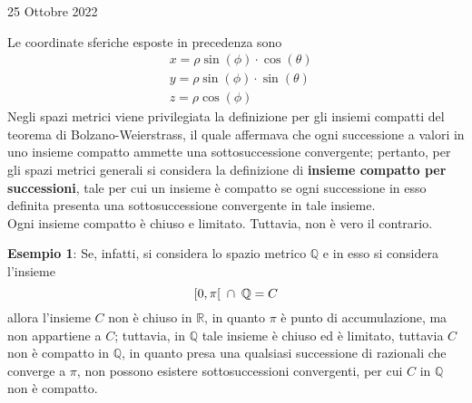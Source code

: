 \documentclass[a4paper]{extarticle}
\begin{document}
\newpage
\noindent
\begin{center}
    25 Ottobre 2022
\end{center}
Le coordinate sferiche esposte in precedenza sono
\begin{align*}
    &x=\rho \sin(\phi) \cdot \cos(\theta)\\
    &y=\rho \sin(\phi) \cdot \sin(\theta)\\
    &z=\rho \cos(\phi)
\end{align*}
Negli spazi metrici viene privilegiata la definizione per gli insiemi compatti del teorema di Bolzano-Weierstrass, il quale affermava che ogni successione a valori in uno insieme compatto ammette una sottosuccessione convergente; pertanto, per gli spazi metrici generali si considera la definizione di \textbf{insieme compatto per successioni}, tale per cui un insieme è compatto se ogni successione in esso definita presenta una sottosuccessione convergente in tale insieme.\\
Ogni insieme compatto è chiuso e limitato. Tuttavia, non è vero il contrario. 

\vspace{1em}
\noindent
\textbf{Esempio 1}: Se, infatti, si considera lo spazio metrico $\mathbb{Q}$ e in esso si considera l'insieme
\[[0,\pi[ \hspace{0.5em} \cap \hspace{0.5em} \mathbb{Q} = C\]
allora l'insieme $C$ non è chiuso in $\mathbb{R}$, in quanto $\pi$ è punto di accumulazione, ma non appartiene a $C$; tuttavia, in $\mathbb{Q}$ tale insieme è chiuso ed è limitato, tuttavia $C$ non è compatto in $\mathbb{Q}$, in quanto presa una qualsiasi successione di razionali che converge a $\pi$, non possono esistere sottosuccessioni convergenti, per cui $C$ in $\mathbb{Q}$ non è compatto.
\end{document}
